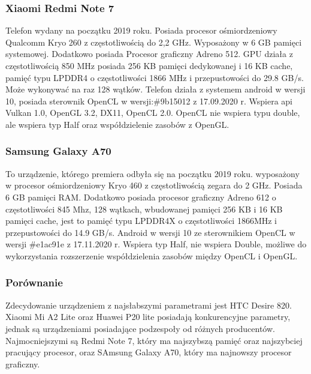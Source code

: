 \subsubsection[Xiaomi Redmi Note 7]{Xiaomi Redmi Note 7}
Telefon wydany na początku 2019 roku. Posiada procesor ośmiordzeniowy Qualcomm Kryo 260 z częstotliwością do 2,2 GHz. Wyposażony w 6 GB pamięci systemowej. Dodatkowo posiada Procesor graficzny Adreno 512. GPU działa z częstotliwością 850 MHz posiada 256 KB pamięci dedykowanej i 16 KB cache, pamięć typu LPDDR4 o częstotliwości 1866 MHz i przepustowości do 29.8 GB/s. Może wykonywać na raz 128 wątków. Telefon działa z systemem android w wersji 10, posiada sterownik OpenCL w wersji:\#9b15012 z 17.09.2020 r. Wspiera api Vulkan 1.0, OpenGL 3.2, DX11, OpenCL 2.0. OpenCL nie wspiera typu double, ale wspiera typ Half oraz współdzielenie zasobów z OpenGL.
\subsubsection[Samsung Galaxy A70]{Samsung Galaxy A70}
To urządzenie, którego premiera odbyła się na początku 2019 roku. wyposażony w procesor ośmiordzeniowy Kryo 460 z częstotliwością zegara do 2 GHz. Posiada 6 GB pamięci RAM. Dodatkowo posiada procesor graficzny Adreno 612 o częstotliwości 845 Mhz, 128 wątkach, wbudowanej pamięci 256 KB i 16 KB pamięci cache, jest to pamięć typu LPDDR4X o częstotliwości 1866MHz i przepustowości do 14.9 GB/s. Android w wersji 10 ze sterownikiem OpenCL w wersji \#e1ac91e z 17.11.2020 r. Wspiera typ Half, nie wspiera Double, możliwe do wykorzystania rozszerzenie współdzielenia zasobów między OpenCL i OpenGL.
\subsubsection[Porównanie]{Porównanie}
Zdecydowanie urządzeniem z najsłabszymi parametrami jest HTC Desire 820. Xiaomi Mi A2 Lite oraz Huawei P20 lite posiadają konkurencyjne parametry, jednak są urządzeniami posiadające podzespoły od różnych producentów. Najmocniejszymi są Redmi Note 7, który ma najszybszą pamięć oraz najszybciej pracujący procesor, oraz SAmsung Galaxy A70, który ma najnowszy procesor graficzny.

